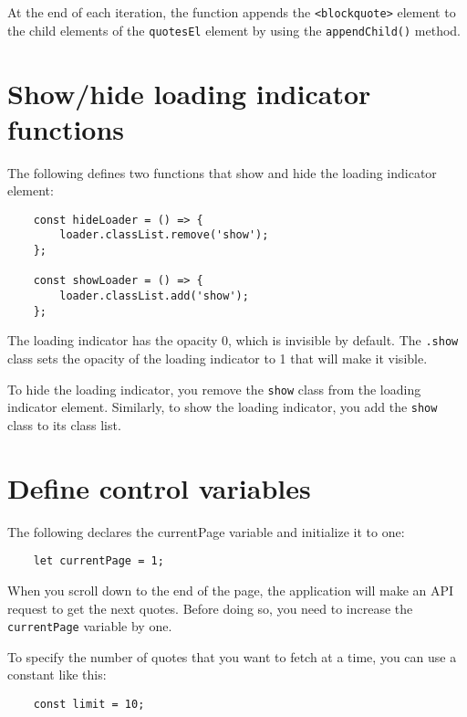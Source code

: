 \documentclass[11pt]{article}
\begin{document}
\noindent
At the end of each iteration, the function appends the \verb|<blockquote>|
element to the child elements of the \verb|quotesEl| element by
using the \verb|appendChild()| method.

\section*{Show/hide loading indicator functions}

The following defines two functions that show and hide the loading indicator element:

\begin{lstlisting}
    const hideLoader = () => {
        loader.classList.remove('show');
    };

    const showLoader = () => {
        loader.classList.add('show');
    };
\end{lstlisting}

\noindent
The loading indicator has the opacity 0, which is invisible by default.
The \verb|.show| class sets the opacity of the loading indicator to 1
that will make it visible.
\newline

\noindent
To hide the loading indicator, you remove the \verb|show| class from the
loading indicator element. Similarly, to show the loading indicator,
you add the \verb|show| class to its class list.

\section*{Define control variables}

The following declares the currentPage variable and initialize it to one:

\begin{lstlisting}
    let currentPage = 1;
\end{lstlisting}

\noindent
When you scroll down to the end of the page, the application will make
an API request to get the next quotes. Before doing so, you need to
increase the \verb|currentPage| variable by one.
\newline

\noindent
To specify the number of quotes that you want to fetch at a time,
you can use a constant like this:

\begin{lstlisting}
    const limit = 10;
\end{lstlisting}
\end{document}
